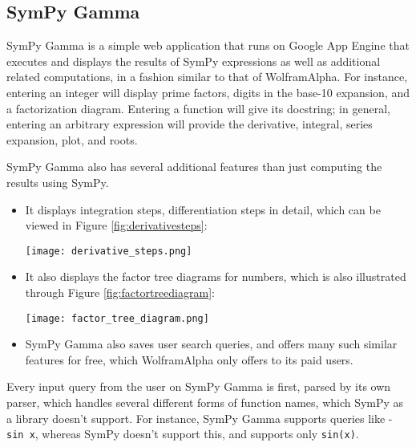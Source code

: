 \subsection{SymPy Gamma}\label{sympy-gamma}

SymPy Gamma is a simple web application that runs on Google App Engine 
that executes and displays the results of SymPy expressions as well as
additional related computations, in a fashion similar to that of
Wolfram\textbar{}Alpha. For instance, entering an integer will display
prime factors, digits in the base-10 expansion, and a factorization
diagram. Entering a function will give its docstring; in general,
entering an arbitrary expression will provide the derivative, integral,
series expansion, plot, and roots.

SymPy Gamma also has several additional features than just computing the
results using SymPy.

\begin{itemize}
\item
  It displays integration steps, differentiation steps in detail, which
  can be viewed in Figure \ref{fig:derivativesteps}:\par
\begin{minipage}{\textwidth}
    \centering
    \texttt{[image: derivative\_steps.png]}
    \label{fig:derivativesteps}
\end{minipage}
\item
  It also displays the factor tree diagrams for numbers, which is also
  illustrated through Figure \ref{fig:factortreediagram}:\par
\begin{minipage}{\textwidth}
    \centering
    \texttt{[image: factor\_tree\_diagram.png]}
    \label{fig:factortreediagram}
\end{minipage}
\item
  SymPy Gamma also saves user search queries, and offers many such 
  similar features for free, which Wolfram\textbar{}Alpha only offers 
  to its paid users.
\end{itemize}
Every input query from the user on SymPy Gamma is first, parsed by its
own parser, which handles several different forms of function names,
which SymPy as a library doesn't support. For instance, SymPy Gamma
supports queries like - \texttt{sin\ x}, whereas SymPy doesn't support
this, and supports only \texttt{sin(x)}.

